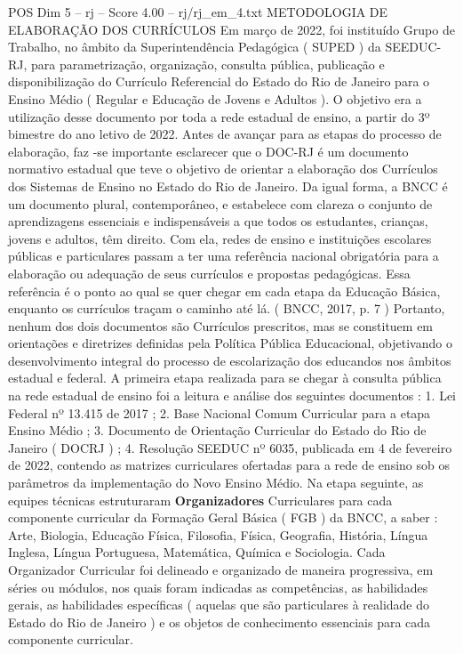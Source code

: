 \begin{textsample}{POS Dim 5 – rj – Score 4.00 – rj/rj\_em\_4.txt}  \label{ex:f5_pos_195}
METODOLOGIA DE ELABORAÇÃO DOS CURRÍCULOS Em março de 2022, foi instituído Grupo de Trabalho, no âmbito da Superintendência Pedagógica ( SUPED ) da SEEDUC-RJ, para parametrização, organização, consulta pública, publicação e disponibilização do Currículo Referencial do Estado do Rio de Janeiro para o Ensino Médio ( Regular e Educação de Jovens e Adultos ).
O objetivo era a utilização desse documento por toda a rede estadual de ensino, a partir do 3º bimestre do ano letivo de 2022.
Antes de avançar para as etapas do processo de elaboração, faz -se importante esclarecer que o DOC-RJ é um documento normativo estadual que teve o objetivo de orientar a elaboração dos Currículos dos Sistemas de Ensino no Estado do Rio de Janeiro.
Da igual forma, a BNCC é um documento plural, contemporâneo, e estabelece com clareza o conjunto de aprendizagens essenciais e indispensáveis a que todos os estudantes, crianças, jovens e adultos, têm direito.
Com ela, redes de ensino e instituições escolares públicas e particulares passam a ter uma referência nacional obrigatória para a elaboração ou adequação de seus currículos e propostas pedagógicas.
Essa referência é o ponto ao qual se quer chegar em cada etapa da Educação Básica, enquanto os currículos traçam o caminho até lá. ( BNCC, 2017, p. 7 ) Portanto, nenhum dos dois documentos são Currículos prescritos, mas se constituem em orientações e diretrizes definidas pela Política Pública Educacional, objetivando o desenvolvimento integral do processo de escolarização dos educandos nos âmbitos estadual e federal.
A primeira etapa realizada para se chegar à consulta pública na rede estadual de ensino foi a leitura e análise dos seguintes documentos : 1.
Lei Federal nº 13.415 de 2017 ; 2.
Base Nacional Comum Curricular para a etapa Ensino Médio ; 3.
Documento de Orientação Curricular do Estado do Rio de Janeiro ( DOCRJ ) ; 4.
Resolução SEEDUC nº 6035, publicada em 4 de fevereiro de 2022, contendo as matrizes curriculares ofertadas para a rede de ensino sob os parâmetros da implementação do Novo Ensino Médio.
Na etapa seguinte, as equipes técnicas estruturaram \textbf{Organizadores} Curriculares para cada componente curricular da Formação Geral Básica ( FGB ) da BNCC, a saber : Arte, Biologia, Educação Física, Filosofia, Física, Geografia, História, Língua Inglesa, Língua Portuguesa, Matemática, Química e Sociologia.
Cada Organizador Curricular foi delineado e organizado de maneira progressiva, em séries ou módulos, nos quais foram indicadas as competências, as habilidades gerais, as habilidades específicas ( aquelas que são particulares à realidade do Estado do Rio de Janeiro ) e os objetos de conhecimento essenciais para cada componente curricular.

\end{textsample}
